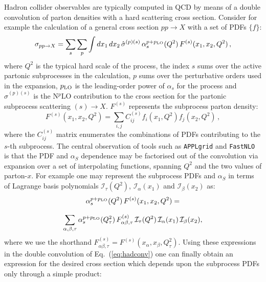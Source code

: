 \documentclass[preprint,12pt]{elsarticle}
\begin{document}
Hadron collider observables are typically computed in QCD by means of a double
convolution of parton densities with a hard scattering
cross section. Consider for example the calculation of a general
cross section $pp\to X$ with a set of PDFs $\{f\}$:
\begin{equation}\label{eq:hadconv}
  \sigma_{pp\to X} =
  \sum_{s}\sum_{p} \int dx_1\,dx_2\,
  \hat{\sigma}^{(p)(s)}\,\alpha_s^{p+p_{\rm LO}}(Q^2) \,F^{(s)}(x_1,x_2, Q^2)\,,
\end{equation}
where $Q^2$ is the typical hard scale of the process, the index $s$
sums over the active partonic subprocesses in the calculation, $p$ sums over
the perturbative orders used in the expansion, $p_{\rm
  LO}$ is the leading-order power of $\alpha_s$ for the process and
$\hat{\sigma}^{(p)(s)}$ is the N$^p$LO contribution to the
cross section for the partonic subprocess scattering $(s)\to
X$. $F^{(s)}$ represents the subprocess parton density:
\begin{equation}\label{eq:APPLsubproc}
  F^{(s)}(x_1,x_2, Q^2) =\sum_{i,j} C^{(s)}_{ij} 
  f_i(x_{1},Q^2)f_j(x_{2},Q^2)\,,
\end{equation}
where the $C^{(s)}_{ij}$ matrix enumerates the combinations of PDFs
contributing to the $s$-th subprocess.  The central observation of
tools such as {\tt APPLgrid} and {\tt FastNLO} is that the PDF and
$\alpha_S$ dependence may be factorised out of the convolution via
expansion over a set of interpolating functions, spanning $Q^2$ and
the two values of parton-$x$. For example one may represent the
subprocess PDFs and $\alpha_S$ in terms of Lagrange basis
polynomials $\mathcal{I}_\tau(Q^2)$, $\mathcal{I}_\alpha(x_1)$ and
$\mathcal{I}_\beta(x_2)$ as:
\begin{equation}\label{eq:interpolation}
\begin{array}{c}
\displaystyle \alpha_s^{p+p_{\rm LO}}(Q^2) \,F^{(s)}(x_1,x_2, Q^2)
  =\\
\\
\displaystyle \sum_{\alpha,\beta,\tau} \alpha_s^{p+p_{\rm LO}}(Q_\tau^2)
  \,F^{(s)}_{\alpha\beta , \tau}
  \,\mathcal{I}_\tau(Q^2)\,\mathcal{I}_\alpha(x_1)
  \,\mathcal{I}_\beta(x_2),
\end{array}
\end{equation}
where we use the shorthand $F^{(s)}_{\alpha\beta ,\tau} =
F^{(s)}(x_\alpha, x_\beta,Q_\tau^2)$.  Using these expressions in the
double convolution of Eq.~(\ref{eq:hadconv}) one can finally obtain an
expression for the desired cross section which depends upon the
subprocess PDFs only through a simple product:
\end{document}
